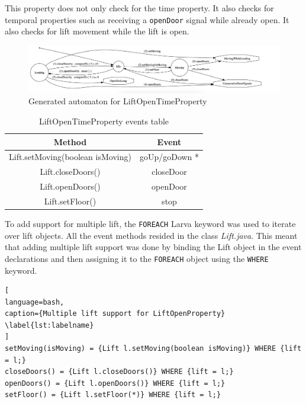 \documentclass[a4paper, 12pt]{article}
\begin{document}
This property does not only check for the time property. It also checks for temporal properties such as receiving a \texttt{openDoor} signal while already open. It also checks for lift movement while the lift is open. 

\begin{figure}[h]
   \centering
   \includegraphics[width=\textwidth,height=\textheight,keepaspectratio]{images/generated-automaton-LiftOpenTimeProperty} %
   \caption{Generated automaton for LiftOpenTimeProperty}
   \label{fig:generated-automaton-LiftOpenTimeProperty}
\end{figure}

\begin{table}[h]
   \centering
   \begin{tabular}{@{}  |c|c| @{}} %
      \toprule
      Method    & Event \\
      \midrule
      Lift.setMoving(boolean isMoving)   &  goUp/goDown *\\
      Lift.closeDoors()       & closeDoor  \\
      Lift.openDoors()       & openDoor  \\
      Lift.setFloor() & stop    \\
      \bottomrule
   \end{tabular}
   \caption{LiftOpenTimeProperty events table}
   \label{tab:lift-open-time-property}
\end{table}

To add support for multiple lift, the \texttt{FOREACH} Larva keyword was used to iterate over lift objects. All the event methods resided in the class \textit{Lift.java}. This meant that adding multiple lift support was done by binding the Lift object in the event declarations and then assigning it to the \texttt{FOREACH} object using the \texttt{WHERE} keyword.


\begin{lstlisting}[
language=bash, 
caption={Multiple lift support for LiftOpenProperty}
\label{lst:labelname}
]
setMoving(isMoving) = {Lift l.setMoving(boolean isMoving)} WHERE {lift = l;} 
closeDoors() = {Lift l.closeDoors()} WHERE {lift = l;}
openDoors() = {Lift l.openDoors()} WHERE {lift = l;}
setFloor() = {Lift l.setFloor(*)} WHERE {lift = l;}
\end{lstlisting}
\end{document}
